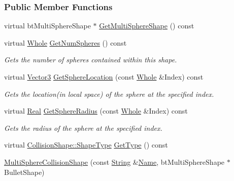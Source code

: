 \subsubsection*{Public Member Functions}
\begin{DoxyCompactItemize}
\item 
virtual btMultiSphereShape $\ast$ \hyperlink{classMezzanine_1_1MultiSphereCollisionShape_a760b9d31f64bfc972739325dcaef5902}{GetMultiSphereShape} () const 
\item 
virtual \hyperlink{namespaceMezzanine_adcbb6ce6d1eb4379d109e51171e2e493}{Whole} \hyperlink{classMezzanine_1_1MultiSphereCollisionShape_a5abef10c7df0bf2384c1d64089145ec5}{GetNumSpheres} () const 
\begin{DoxyCompactList}\small\item\em Gets the number of spheres contained within this shape. \item\end{DoxyCompactList}\item 
virtual \hyperlink{classMezzanine_1_1Vector3}{Vector3} \hyperlink{classMezzanine_1_1MultiSphereCollisionShape_a1d568dd2b4641f684b55ba9c249f4ce2}{GetSphereLocation} (const \hyperlink{namespaceMezzanine_adcbb6ce6d1eb4379d109e51171e2e493}{Whole} \&Index) const 
\begin{DoxyCompactList}\small\item\em Gets the location(in local space) of the sphere at the specified index. \item\end{DoxyCompactList}\item 
virtual \hyperlink{namespaceMezzanine_a726731b1a7df72bf3583e4a97282c6f6}{Real} \hyperlink{classMezzanine_1_1MultiSphereCollisionShape_a78e91eae4a3c4e43a295f25a5ca363ef}{GetSphereRadius} (const \hyperlink{namespaceMezzanine_adcbb6ce6d1eb4379d109e51171e2e493}{Whole} \&Index) const 
\begin{DoxyCompactList}\small\item\em Gets the radius of the sphere at the specified index. \item\end{DoxyCompactList}\item 
virtual \hyperlink{classMezzanine_1_1CollisionShape_ad04186055565998879b64176d6dd100d}{CollisionShape::ShapeType} \hyperlink{classMezzanine_1_1MultiSphereCollisionShape_ad4b8a2e2f71686e2495d414a13b0f95a}{GetType} () const 
\item 
\hyperlink{classMezzanine_1_1MultiSphereCollisionShape_aac4400d6c26ed1e9b5707d278d487c8f}{MultiSphereCollisionShape} (const \hyperlink{namespaceMezzanine_acf9fcc130e6ebf08e3d8491aebcf1c86}{String} \&\hyperlink{classMezzanine_1_1CollisionShape_aac524c5c56fa4d158bc071f8aecfbe79}{Name}, btMultiSphereShape $\ast$BulletShape)

\end{DoxyCompactItemize}
